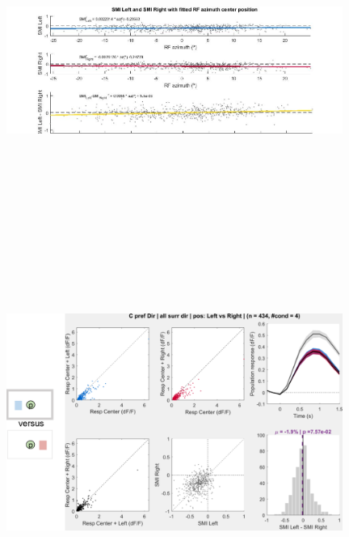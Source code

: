 \begin{figure}[H] \centering \includegraphics[width=11cm,height=11cm,keepaspectratio]{Figures/7.Results/population/sel/15_LeftversusRightwithAzimuth.jpg} 
\end{figure}

\begin{figure}[H] \centering \includegraphics[width=11cm,height=11cm,keepaspectratio]{Figures/7.Results/population/sel/diagrams/3.png} 
\end{figure}


